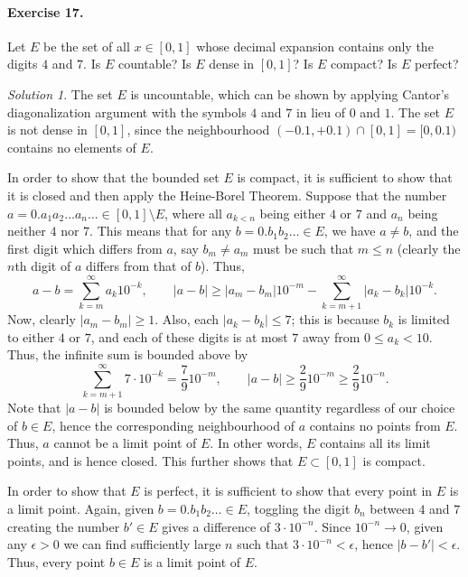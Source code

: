 \documentclass[11pt]{report}
\theoremstyle{remark}
\newtheorem*{solution}{Solution}
\begin{document}
    \paragraph{Exercise 17.} Let $E$ be the set of all $x \in [0, 1]$ whose decimal
    expansion contains only the digits $4$ and $7$. Is $E$ countable? Is $E$ dense
    in $[0, 1]$? Is $E$ compact? Is $E$ perfect?
    \begin{solution}
        The set $E$ is uncountable, which can be shown by applying Cantor's
        diagonalization argument with the symbols $4$ and $7$ in lieu of $0$ and
        $1$. The set $E$ is not dense in $[0, 1]$, since the neighbourhood $(-0.1,
        +0.1) \cap [0, 1] = [0, 0.1)$ contains no elements of $E$.

        In order to show that the bounded set $E$ is compact, it is sufficient to
        show that it is closed and then apply the Heine-Borel Theorem.
        Suppose that the number $a = 0.a_1a_2 \dots a_n \dots \in [0, 1]\setminus E$,
        where all $a_{k < n}$ being either $4$ or $7$ and $a_n$ being neither $4$
        nor $7$. This means that for any $b = 0.b_1b_2 \dots\in E$, we have $a \neq b$, 
        and the first digit which differs from $a$, say $b_m \neq a_m$ must be such
        that $m \leq n$ (clearly the $n$th digit of $a$ differs from that of $b$).
        Thus, \[
            a - b = \sum_{k = m}^{\infty} a_k10^{-k}, \qquad
            |a - b| \geq |a_m - b_m| 10^{-m} - \sum_{k = m + 1}^\infty |a_k -
            b_k|10^{-k}.
        \] Now, clearly $|a_m - b_m| \geq 1$. Also, each $|a_k - b_k| \leq 7$; this
        is because $b_k$ is limited to either $4$ or $7$, and each of these digits
        is at most $7$ away from $0 \leq a_k < 10$. Thus, the infinite sum is
        bounded above by \[
            \sum_{k = m + 1}^\infty 7 \cdot 10^{-k} = \frac{7}{9}10^{-m}, \qquad |a
            - b| \geq \frac{2}{9}10^{-m} \geq \frac{2}{9}10^{-n}.
        \] Note that $|a - b|$ is bounded below by the same quantity regardless of
        our choice of $b \in E$, hence the corresponding neighbourhood of $a$
        contains no points from $E$. Thus, $a$ cannot be a limit point of $E$. In
        other words, $E$ contains all its limit points, and is hence closed. This
        further shows that $E \subset [0, 1]$ is compact.

        In order to show that $E$ is perfect, it is sufficient to show that every
        point in $E$ is a limit point. Again, given $b = 0.b_1 b_2 \dots \in E$,
        toggling the digit $b_n$ between $4$ and $7$ creating the number $b'\in E$ 
        gives a difference of $3\cdot 10^{-n}$. Since $10^{-n} \to 0$,
        given any $\epsilon > 0$ we can find sufficiently large $n$ such that
        $3\cdot 10^{-n} < \epsilon$, hence $|b - b'| < \epsilon$. Thus, every point
        $b \in E$ is a limit point of $E$.
    \end{solution}
    
\end{document}
